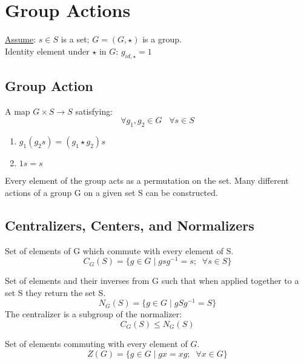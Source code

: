 \chapter{Group Actions}
\underline{Assume}: $s \in S$ is a set; $G = (G, \star)$ is a group. \\
Identity element under $\star$ in $G$: ${g}_{id, \star} = 1$
\section{Group Action}
\begin{defn}
	A map $G \times S \to S$ satisfying:
	\[\forall {g}_{1}, {g}_{2} \in G \; \; \; \forall s \in S\]
	\begin{enumerate}
		\item $ {g}_{1}  ( {g}_{2}  s ) = ( {g}_{1} \star {g}_{2} ) s $
		\item $ 1s = s$ 
	\end{enumerate}
Every element of the group acts as a permutation on the set. Many different actions of a group G on a given set S can be constructed.
\end{defn}

\section{Centralizers, Centers, and Normalizers}
\begin{defn}[Centralizer of $S$ in $G$]
	Set of elements of G which commute with every element of S.
	\[ {C}_{G}(S) = \{g \in G \mid g  s  {g}^{-1} = s;  \;\; \forall s \in S \}\]
\end{defn}
\begin{defn}[Normalizer of $S$ in $G$]
	Set of elements and their inverses from G such that when applied together to a set S they return the set S.
	\[{N}_{G}(S) = \{g \in G \mid gS{g}^{-1} = S\}\]
	The centralizer is a subgroup of the normalizer:
	\[{C}_{G}(S) \leq {N}_{G}(S)\]
\end{defn}
\begin{defn}[Center of $G$]
	Set of elements commuting with every element of $G$.
	\[Z(G) = \{g \in G \mid gx = xg;  \;\; \forall x \in G\}\]
\end{defn}


